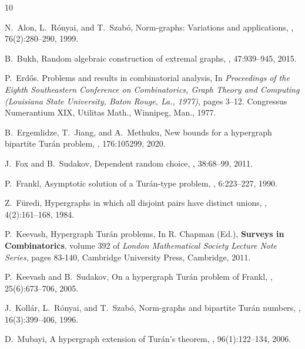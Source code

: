 \documentclass[a4paper,11pt]{article}
\theoremstyle{definition}
\begin{document}
\begin{thebibliography}{10}

N.~Alon, L.~Rónyai, and T.~Szabó,
\newblock Norm-graphs: Variations and applications,
, 76(2):280--290,
  1999.

B.~Bukh,
\newblock Random algebraic construction of extremal graphs,
, 47:939--945, 2015.

P.~Erd\H{o}s.
\newblock Problems and results in combinatorial analysis,
\newblock In {\em Proceedings of the Eighth Southeastern Conference on
  Combinatorics, Graph Theory and Computing (Louisiana State University, Baton
  Rouge, La., 1977)}, pages 3--12. Congressus Numerantium XIX, Utilitas Math.,
  Winnipeg, Man., 1977.

B.~Ergemlidze, T.~Jiang, and A.~Methuku,
\newblock New bounds for a hypergraph bipartite {Tur{\'a}n} problem,
, 176:105299, 2020.

J.~Fox and B.~Sudakov,
\newblock Dependent random choice,
, 38:68--99, 2011.

P.~Frankl,
\newblock Asymptotic solution of a {T}ur{\'a}n-type problem,
, 6:223--227, 1990.

Z.~F{\"u}redi,
\newblock Hypergraphs in which all disjoint pairs have distinct unions,
, 4(2):161--168, 1984.

P.~Keevash,
\newblock Hypergraph Turán problems, In R. Chapman (Ed.), {\bf Surveys in Combinatorics}, volume 392 of {\em London Mathematical Society Lecture Note Series}, pages 83-140, Cambridge University Press, Cambridge, 2011.

P.~Keevash and B.~Sudakov,
\newblock On a hypergraph {Tur{\'a}n} problem of {F}rankl,
, 25(6):673--706, 2005.

J.~Koll{\'a}r, L.~R{\'o}nyai, and T.~Szab{\'o},
\newblock Norm-graphs and bipartite {Tur{\'a}n} numbers,
, 16(3):399--406, 1996.

D.~Mubayi,
\newblock A hypergraph extension of {T}ur{\'a}n's theorem,
, 96(1):122--134,
  2006.


\end{thebibliography}
\end{document}
